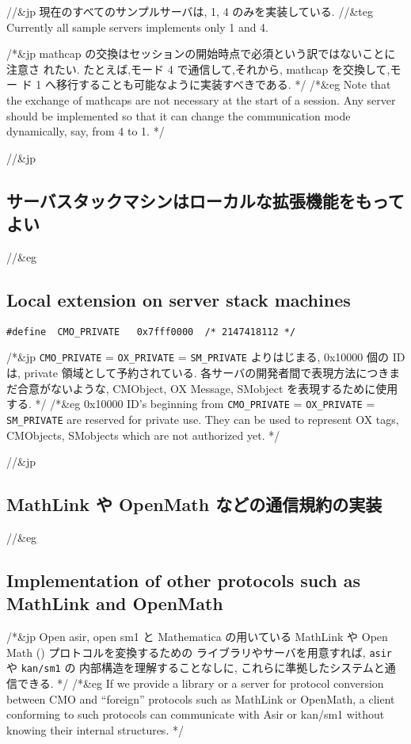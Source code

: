 //&jp 現在のすべてのサンプルサーバは, 1, 4 のみを実装している.
//&teg Currently all sample servers implements only 1 and 4.

/*&jp
mathcap の交換はセッションの開始時点で必須という訳ではないことに注意さ
れたい.  たとえば,モード 4 で通信して,それから, mathcap を交換して,モー
ド 1 へ移行することも可能なように実装すべきである.
*/
/*&eg
Note that the exchange of mathcaps are not necessary at the start
of a session. Any server should be implemented so that it can
change the communication mode dynamically, say, from 4 to 1.
*/

//&jp \subsection{サーバスタックマシンはローカルな拡張機能をもってよい}
//&eg \subsection{Local extension on server stack machines}

\begin{verbatim}
#define  CMO_PRIVATE   0x7fff0000  /* 2147418112 */
\end{verbatim}

/*&jp
{\tt CMO\_PRIVATE} = {\tt OX\_PRIVATE} = {\tt SM\_PRIVATE} 
よりはじまる, 0x10000 個の ID は, private 領域として予約されている.
各サーバの開発者間で表現方法につきまだ合意がないような, CMObject, 
OX Message, SMobject を表現するために使用する.
*/
/*&eg
0x10000 ID's beginning from 
{\tt CMO\_PRIVATE} = {\tt OX\_PRIVATE} = {\tt SM\_PRIVATE} 
are reserved for private use.
They can be used to represent OX tags, CMObjects, SMobjects
which are not authorized yet.
*/


//&jp \subsection{MathLink や OpenMath などの通信規約の実装}
//&eg \subsection{Implementation of other protocols such as MathLink and OpenMath}

/*&jp
Open asir, open sm1 と Mathematica の用いている MathLink や 
Open Math (\cite{openmath})
プロトコルを変換するための
ライブラリやサーバを用意すれば, {\tt asir} や {\tt kan/sm1} の
内部構造を理解することなしに, これらに準拠したシステムと通信できる.
*/
/*&eg
If we provide a library or a server for protocol conversion
between CMO and ``foreign'' protocols such as MathLink or OpenMath,
a client conforming to such protocols can communicate with 
Asir or kan/sm1 without knowing their internal structures.
*/

